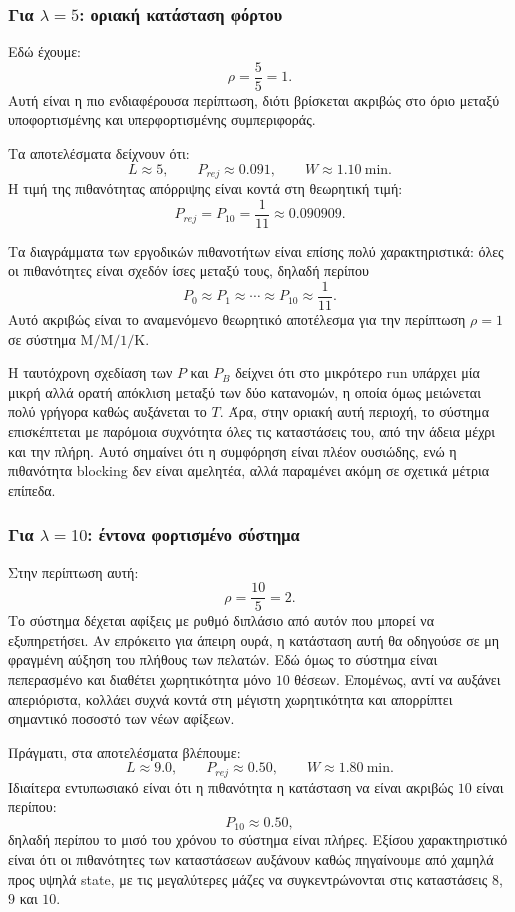 \documentclass{article}
\begin{document}
\subsubsection*{Για $\lambda=5$: οριακή κατάσταση φόρτου}

Εδώ έχουμε:
\[
\rho=\frac{5}{5}=1.
\]
Αυτή είναι η πιο ενδιαφέρουσα περίπτωση, διότι βρίσκεται ακριβώς στο όριο μεταξύ υποφορτισμένης και υπερφορτισμένης συμπεριφοράς.

Τα αποτελέσματα δείχνουν ότι:
\[
L \approx 5,\qquad P_{rej}\approx 0.091,\qquad W\approx 1.10 \ \text{min}.
\]
Η τιμή της πιθανότητας απόρριψης είναι κοντά στη θεωρητική τιμή:
\[
P_{rej}=P_{10}=\frac{1}{11}\approx 0.090909.
\]

Τα διαγράμματα των εργοδικών πιθανοτήτων είναι επίσης πολύ χαρακτηριστικά: όλες οι πιθανότητες είναι σχεδόν ίσες μεταξύ τους, δηλαδή περίπου
\[
P_0\approx P_1\approx \cdots \approx P_{10}\approx \frac{1}{11}.
\]
Αυτό ακριβώς είναι το αναμενόμενο θεωρητικό αποτέλεσμα για την περίπτωση $\rho=1$ σε σύστημα $\mathrm{M/M/1/K}$.

Η ταυτόχρονη σχεδίαση των $P$ και $P_B$ δείχνει ότι στο μικρότερο run υπάρχει μία μικρή αλλά ορατή απόκλιση μεταξύ των δύο κατανομών, η οποία όμως μειώνεται πολύ γρήγορα καθώς αυξάνεται το $T$. Άρα, στην οριακή αυτή περιοχή, το σύστημα επισκέπτεται με παρόμοια συχνότητα όλες τις καταστάσεις του, από την άδεια μέχρι και την πλήρη. Αυτό σημαίνει ότι η συμφόρηση είναι πλέον ουσιώδης, ενώ η πιθανότητα blocking δεν είναι αμελητέα, αλλά παραμένει ακόμη σε σχετικά μέτρια επίπεδα.

\subsubsection*{Για $\lambda=10$: έντονα φορτισμένο σύστημα}

Στην περίπτωση αυτή:
\[
\rho=\frac{10}{5}=2.
\]
Το σύστημα δέχεται αφίξεις με ρυθμό διπλάσιο από αυτόν που μπορεί να εξυπηρετήσει. Αν επρόκειτο για άπειρη ουρά, η κατάσταση αυτή θα οδηγούσε σε μη φραγμένη αύξηση του πλήθους των πελατών. Εδώ όμως το σύστημα είναι πεπερασμένο και διαθέτει χωρητικότητα μόνο $10$ θέσεων. Επομένως, αντί να αυξάνει απεριόριστα, κολλάει συχνά κοντά στη μέγιστη χωρητικότητα και απορρίπτει σημαντικό ποσοστό των νέων αφίξεων.

Πράγματι, στα αποτελέσματα βλέπουμε:
\[
L \approx 9.0,\qquad P_{rej}\approx 0.50,\qquad W\approx 1.80 \ \text{min}.
\]
Ιδιαίτερα εντυπωσιακό είναι ότι η πιθανότητα η κατάσταση να είναι ακριβώς $10$ είναι περίπου:
\[
P_{10}\approx 0.50,
\]
δηλαδή περίπου το μισό του χρόνου το σύστημα είναι πλήρες. Εξίσου χαρακτηριστικό είναι ότι οι πιθανότητες των καταστάσεων αυξάνουν καθώς πηγαίνουμε από χαμηλά προς υψηλά state, με τις μεγαλύτερες μάζες να συγκεντρώνονται στις καταστάσεις $8$, $9$ και $10$.
\end{document}
